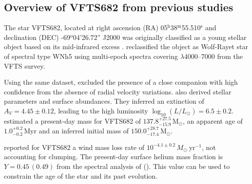 \documentclass[apjl,twocolumn]{emulateapj}
\newcommand{\Msun}{{\,\mathrm{M}_\odot}}
\DeclareRobustCommand{\Tabref}[1]{Table~\ref{#1}}
\begin{document}
\subsection{ Overview of VFTS682 from previous studies \label{data:vfts683}}

The star VFTS682, located at right ascension (RA)
05$^\mathrm{h}$38$^\mathrm{m}$55.510$^\mathrm{s}$  and declination
(DEC) \mbox{-69$^\mathrm{o}$04'26.72''} J2000 \citep[][%
]{evans:11}
was originally classified as a young stellar object based on its
mid-infrared excess \citep{gruendl:09}. \citet{evans:11} reclassified the
object as Wolf-Rayet star of spectral type WNh5 using multi-epoch
spectra covering $\lambda$4000--7000 from the
VFTS survey. %

Using the same dataset,
\citet{bestenlehner:11} excluded the presence of a close companion
with high confidence from the absence of radial velocity variations.
\citet{bestenlehner:11} %
also derived stellar
parameters and surface abundances. They inferred an extinction
of $A_V=4.45\pm0.12$, leading to the high luminosity
$\log_{10}(L/L_\odot) =  6.5\pm0.2$. \citet{schneider:18} estimated
a present-day mass for VFTS682 of $137.8^{+27.5}_ {-15.9}\Msun$, an
apparent age of $1.0^{+0.2}_{-0.2}$\,Myr and an inferred initial mass
of $150.0^{+28.7}_{-17.4}\Msun$.%

\citet{bestenlehner:11} reported for VFTS682 a wind mass loss rate of
$10^{-4.1\pm0.2}\,M_\odot \ \mathrm{yr}^{-1}$, %
not accounting for
clumping. The present-day surface helium mass
fraction is $Y=0.45\, (0.49)$ from the spectral analysis of
\cite{bestenlehner:11} (\citealt{rubio-diez:17}). This value can be
used to constrain the age of the star and its past evolution.

\end{document}
